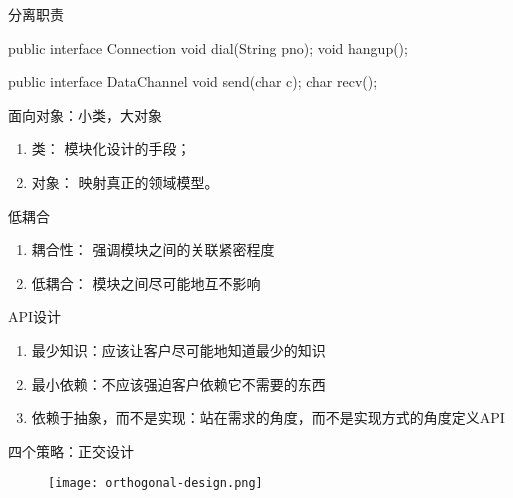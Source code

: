 \begin{frame}[fragile]{分离职责}
  \begin{java}
public interface Connection {
  void dial(String pno);
  void hangup();
}

public interface DataChannel {
  void send(char c);
  char recv(); 
}
  \end{java}
\end{frame}

\begin{frame}[fragile]{面向对象：小类，大对象}
\begin{enumerate}
  \item \alert{类：} 模块化设计的手段；
  \item \alert{对象：} 映射真正的领域模型。
\end{enumerate}
\end{frame}

\begin{frame}{低耦合}
\begin{enumerate}
  \item \alert{耦合性：} 强调模块之间的关联紧密程度
  \item \alert{低耦合：} 模块之间尽可能地互不影响
\end{enumerate}
\end{frame}

\begin{frame}{API设计}
\begin{enumerate}
  \item \alert{最少知识}：应该让客户尽可能地知道最少的知识
  \item \alert{最小依赖}：不应该强迫客户依赖它不需要的东西
  \item \alert{依赖于抽象，而不是实现}：站在需求的角度，而不是实现方式的角度定义API    
\end{enumerate}
\end{frame}

\begin{frame}{四个策略：正交设计}
  \begin{figure}
    \centering
    \texttt{[image: orthogonal-design.png]}
  \end{figure}
\end{frame}


